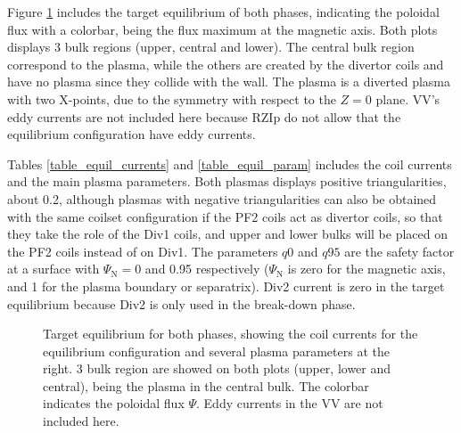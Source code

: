 \documentclass[a4paper,12pt,oneside]{book}
\begin{document}
Figure \ref{fig_eq} includes the target equilibrium of both phases, indicating the poloidal flux with a colorbar, being the flux maximum at the magnetic axis. Both plots displays 3 bulk regions (upper, central and lower). The central bulk region correspond to the plasma, while the others are created by the divertor coils and have no plasma since they collide with the wall. The plasma is a diverted plasma with two X-points, due to the symmetry with respect to the $Z=0$ plane. VV's eddy currents are not included here because RZIp do not allow that the equilibrium configuration have eddy currents. 

Tables \ref{table_equil_currents} and \ref{table_equil_param} includes the coil currents and the main plasma parameters. Both plasmas displays positive triangularities, about 0.2, although plasmas with negative triangularities can also be obtained with the same coilset configuration if the PF2 coils act as divertor coils, so that they take the role of the Div1 coils, and upper and lower bulks will be placed on the PF2 coils instead of on Div1. The parameters $q0$ and $q95$ are the safety factor at a surface with $\Psi_\text{N}=$0 and 0.95 respectively ($\Psi_\text{N}$ is zero for the magnetic axis, and 1 for the plasma boundary or separatrix). Div2 current is zero in the target equilibrium because Div2 is only used in the break-down phase.

\begin{figure}[htbp]
\centering
{}
\hfill
{}
\caption{Target equilibrium for both phases, showing the coil currents for the equilibrium configuration and several plasma parameters at the right. 3 bulk region are showed on both plots (upper, lower and central), being the plasma in the central bulk. The colorbar indicates the poloidal flux $\Psi$. Eddy currents in the VV are not included here.}
\label{fig_eq}
\end{figure} %
\end{document}
